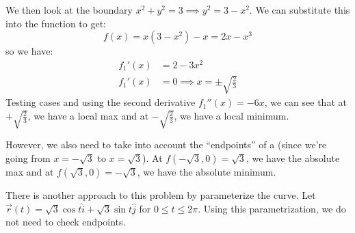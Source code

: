 \begin{itemize}
\begin{example}
        We then look at the boundary $x^2+y^2=3 \implies y^2 = 3-x^2$. We can substitute this into the function to get:
        \begin{equation}
            f(x) = x(3-x^2)-x = 2x-x^3
        \end{equation}
        so we have:
        \begin{align}
            f_1'(x) &= 2-3x^2 \\
            f_1'(x) &= 0 \implies x = \pm \sqrt{\frac{2}{3}}
        \end{align}
        Testing cases and using the second derivative $f_1''(x) = -6x$, we can see that at $+\sqrt{\frac{2}{3}}$, we have a local max and at $-\sqrt{\frac{2}{3}}$, we have a local minimum.
        \vspace{2mm}

        However, we also need to take into account the ``endpoints'' of a  (since we're going from $x=-\sqrt3$ to $x=\sqrt3$). At $f(-\sqrt{3}, 0)=\sqrt{3}$, we have the absolute max and at $f(\sqrt{3}, 0) = -\sqrt{3}$, we have the absolute minimum.

        \tcbline 

        There is another approach to this problem by parameterize the curve. Let $\vec{r}(t) = \sqrt{3} \cos t \hat{i} + \sqrt{3} \sin t \hat{j}$ for $0 \le t \le 2\pi$. Using this parametrization, we do not need to check endpoints.
    \end{example}
\end{itemize}